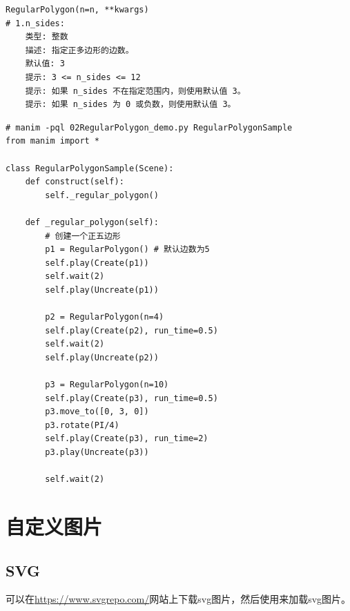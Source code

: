\begin{lstlisting}[style=demostyle,numbers=none]
RegularPolygon(n=n, **kwargs)
# 1.n_sides:
    类型: 整数
    描述: 指定正多边形的边数。
    默认值: 3
    提示: 3 <= n_sides <= 12
    提示: 如果 n_sides 不在指定范围内，则使用默认值 3。
    提示: 如果 n_sides 为 0 或负数，则使用默认值 3。
\end{lstlisting}

\begin{lstlisting}[style=pythonstyle]
# manim -pql 02RegularPolygon_demo.py RegularPolygonSample
from manim import *

class RegularPolygonSample(Scene):
    def construct(self):
        self._regular_polygon()

    def _regular_polygon(self):
        # 创建一个正五边形
        p1 = RegularPolygon() # 默认边数为5
        self.play(Create(p1))
        self.wait(2)
        self.play(Uncreate(p1))
        
        p2 = RegularPolygon(n=4)
        self.play(Create(p2), run_time=0.5)
        self.wait(2)
        self.play(Uncreate(p2))

        p3 = RegularPolygon(n=10)
        self.play(Create(p3), run_time=0.5)
        p3.move_to([0, 3, 0])
        p3.rotate(PI/4)
        self.play(Create(p3), run_time=2)
        p3.play(Uncreate(p3))

        self.wait(2)
\end{lstlisting}

\section{自定义图片}
\subsection{SVG}
可以在\url{https://www.svgrepo.com/}网站上下载svg图片，然后使用来加载svg图片。

